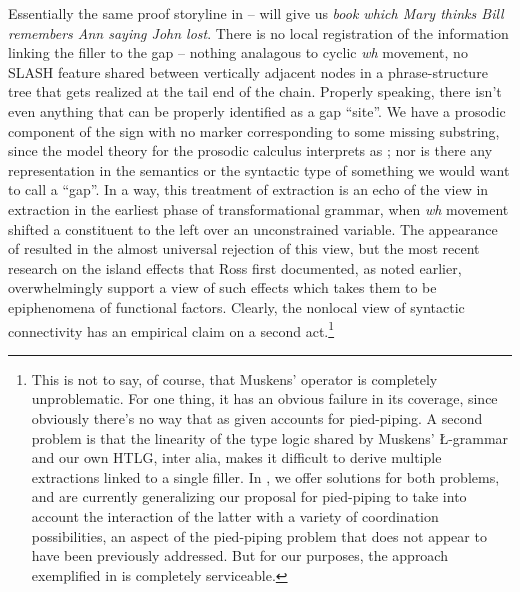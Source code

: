\documentclass[output=paper,colorlinks,citecolor=brown]{langscibook}
\begin{document}
\begin{exe}
 \ex\label{length}
\end{exe}
Essentially the same proof storyline in --
will give us \textit{book which Mary thinks Bill remembers Ann saying
John lost}. There is no local registration of the information linking
the filler to the gap -- nothing analagous to cyclic \textit{wh} movement, no
SLASH feature shared between vertically adjacent nodes in a
phrase-structure tree that gets realized at the tail end of the
chain. Properly speaking, there isn't even anything that can be
properly identified as a gap ``site''. We have a prosodic component of
the sign with no marker corresponding to some missing substring, since
the model theory for the prosodic calculus interprets  as
; nor is there any representation in the semantics or the
syntactic type of something we would want to call a ``gap''. In a way,
this treatment of extraction is an echo of the view in extraction in
the earliest phase of transformational grammar, when \textit{wh} movement
shifted a constituent to the left over an unconstrained variable. The
appearance of \citet{ross67} resulted in the almost universal rejection of
this view, but the most recent research on the island effects that
Ross first documented, as noted earlier, overwhelmingly support a view
of such effects which takes them to be epiphenomena of functional
factors. Clearly, the nonlocal view of syntactic connectivity has an
empirical claim on a second act.\footnote{This is not to say, of
course, that Muskens' operator is completely unproblematic. For one
thing, it has an obvious failure in its coverage, since obviously
there's no way that  as given accounts for pied-piping. A
second problem is that the linearity of the type logic shared by
Muskens' \L-grammar and our own HTLG, inter alia, makes it difficult
to derive multiple extractions linked to a single filler. In \citet{kubotalevineBook},
we offer solutions for both problems, and are currently generalizing
our proposal for pied-piping to take into account the interaction of
the latter with a variety of coordination possibilities, an aspect of
the pied-piping problem that does not appear to have been previously
addressed. But for our purposes, the approach exemplified in 
is completely serviceable.}
\end{document}
